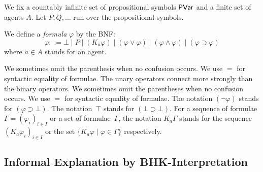   We fix a countably infinite set of propositional symbols
  $\mathsf{PVar}$ and a finite set of agents $A$.
  Let $P, Q, \ldots$ run over the propositional symbols.

  \begin{definition}
   \label{formula}
   We define a \textit{formula} $\varphi$ by the BNF:
   \[
   \varphi ::= \bot\mid P\mid
   (K_a\varphi)\mid(\varphi\vee\varphi)\mid(\varphi\land\varphi)\mid
   (\varphi\supset\varphi)
   \]
   where $a\in A$ stands for an agent.
  \end{definition}
  We sometimes omit the parenthesis when no confusion occurs. We use $=$ for syntactic
  equality of formulae.
  \noindent The unary operators connect more strongly than the binary operators.
  We sometimes omit the parentheses when no confusion occurs. We use $=$ for syntactic
  equality of formulae.  The notation $(\neg \varphi)$ stands for $(\varphi\supset \bot)$.
  The notation~$\top$ stands for $(\bot\supset\bot)$.
  For a sequence of formulae $\Gamma = (\varphi_i)_{i\in I}$ or a set of formulae~$\Gamma$,
  the notation $K_a \Gamma$ stands for the sequence $(K_a \varphi_i)_{i\in I}$ or the set
  $\{K_a\varphi\mid \varphi\in \Gamma\}$ respectively.

  \subsection{Informal Explanation by BHK-Interpretation}
  \label{bhk}

